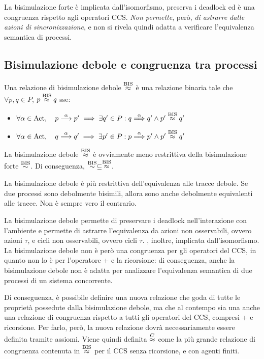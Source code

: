 La bisimulazione forte è implicata dall'isomorfismo, preserva i deadlock ed è
una congruenza rispetto agli operatori CCS. \textit{Non permette}, però,
\textit{di astrarre dalle azioni di sincronizzazione}, e non si rivela quindi adatta a verificare
l'equivalenza semantica di processi.

\subsection*{Bisimulazione debole e congruenza tra processi}
\begin{defn}
    Una relazione di bisimulazione debole $\overset{\textnormal{BIS}}{\approx}$ è una relazione
    binaria tale che $\forall p, q \in P$, $p \overset{\textnormal{BIS}}{\approx} q$ sse:
    \begin{itemize}
        \item $\forall \alpha \in \text{Act}, \quad p \overset{\alpha}{\longrightarrow} p'
        \implies \exists q' \in P : q \overset{\alpha}{\Longrightarrow} q' \land p' \overset{\textnormal{BIS}}{\approx} q'$
        \item $\forall \alpha \in \text{Act}, \quad q \overset{\alpha}{\longrightarrow} q'
        \implies \exists p' \in P : p \overset{\alpha}{\Longrightarrow} p' \land p' \overset{\textnormal{BIS}}{\approx} q'$
    \end{itemize}
\end{defn}

La bisimulazione debole $\overset{\textnormal{BIS}}{\approx}$ è ovviamente meno restrittiva della bisimulazione
forte $\overset{\textnormal{BIS}}{\sim}$. Di conseguenza, $\overset{\textnormal{BIS}}{\sim} \subseteq \overset{\textnormal{BIS}}{\approx}$.

\begin{rem}
    La bisimulazione debole è più restrittiva dell'equivalenza alle tracce debole.
    Se due processi sono debolmente bisimili, allora sono anche debolmente
    equivalenti alle tracce. Non è sempre vero il contrario.
\end{rem}
La bisimulazione debole permette di preservare i deadlock nell'interazione
con l'ambiente e permette di astrarre l'equivalenza da azioni non osservabili,
ovvero azioni $\tau$, e cicli non osservabili, ovvero cicli $\tau$.
\upperAccE, inoltre, implicata dall'isomorfismo.
La bisimulazione debole non è però una congruenza per gli operatori del CCS,
in quanto non lo è per l'operatore + e la ricorsione: di conseguenza,
anche la bisimulazione debole non è adatta per analizzare l'equivalenza
semantica di due processi di un sistema concorrente.

Di conseguenza, è possibile definire una nuova relazione che goda
di tutte le proprietà possedute dalla bisimulazione debole, ma che al contempo
sia una anche una relazione di congruenza rispetto a tutti gli operatori
del CCS, compresi + e ricorsione.
Per farlo, però, la nuova relazione dovrà necessariamente essere definita tramite
assiomi.
Viene quindi definita $\overset{C}{\approx}$ come la più grande
relazione di congruenza contenuta in $\overset{\textnormal{BIS}}{\approx}$ per il CCS senza ricorsione,
e con agenti finiti.

